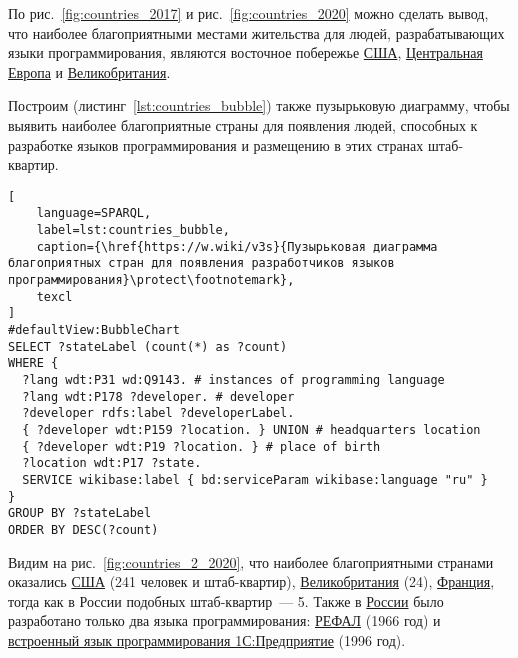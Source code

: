 \begin{marginfigure}
{
\setlength{\fboxsep}{0pt}%
\setlength{\fboxrule}{1pt}%
}
  \caption{Наиболее благоприятные страны для появления людей, способных к разработке языков программирования на 2020 год. Размер пузырька соответствует числу людей, причастных к разработке языков программирования, из соответствующей страны. Ссылка на SPARQL-запрос: \href{https://w.wiki/v3s}{https://w.wiki/v3s}}%
  \label{fig:countries_2_2020}%
\end{marginfigure}
По  рис.~\ref{fig:countries_2017} и рис.~\ref{fig:countries_2020} можно сделать вывод, что наиболее благоприятными местами жительства для людей, разрабатывающих языки программирования, являются восточное побережье \href{https://en.wikipedia.org/wiki/USA}{США}, \href{https://ru.wikipedia.org/wiki/Центральная_Европа}{Центральная Европа} и \href{https://ru.wikipedia.org/wiki/Великобритания}{Великобритания}.

Построим (листинг~\ref{lst:countries_bubble}) также пузырьковую диаграмму, чтобы выявить наиболее благоприятные страны для появления людей, способных к разработке языков программирования и размещению в этих странах штаб-квартир. 
\begin{lstlisting}[
	language=SPARQL,
	label=lst:countries_bubble,
	caption={\href{https://w.wiki/v3s}{Пузырьковая диаграмма благоприятных стран для появления разработчиков языков программирования}\protect\footnotemark},
	texcl
]
#defaultView:BubbleChart
SELECT ?stateLabel (count(*) as ?count)
WHERE {
  ?lang wdt:P31 wd:Q9143. # instances of programming language
  ?lang wdt:P178 ?developer. # developer
  ?developer rdfs:label ?developerLabel. 
  { ?developer wdt:P159 ?location. } UNION # headquarters location
  { ?developer wdt:P19 ?location. } # place of birth
  ?location wdt:P17 ?state.
  SERVICE wikibase:label { bd:serviceParam wikibase:language "ru" } 	
}
GROUP BY ?stateLabel
ORDER BY DESC(?count)
\end{lstlisting}

Видим на рис.~\ref{fig:countries_2_2020}, что наиболее благоприятными странами оказались \href{https://en.wikipedia.org/wiki/USA}{США} (241 человек и штаб-квартир), \href{https://ru.wikipedia.org/wiki/Великобритания}{Великобритания} (24), \href{https://ru.wikipedia.org/wiki/Франция}{Франция}, тогда как в России подобных штаб-квартир~--- 5. Также в \href{https://en.wikipedia.org/wiki/Russia}{России} было разработано только два языка программирования: \href{https://www.wikidata.org/wiki/Q2626418}{РЕФАЛ} (1966 год) и \href{https://www.wikidata.org/wiki/Q65065977}{встроенный язык программирования 1С:Предприятие} (1996 год).

